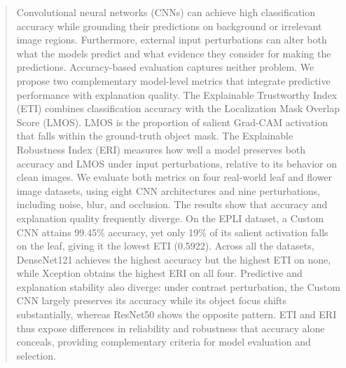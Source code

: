 \documentclass[a4paper,fleqn]{cas-dc}
\begin{document}
	
	
	
	\newcommand{\zahid}[1]{{\color{green}#1}}
	
	\begin{abstract}
	Convolutional neural networks (CNNs) can achieve high classification accuracy while grounding their predictions on background or irrelevant image regions.
	Furthermore, external input perturbations can alter both what the models predict and what evidence they consider for making the predictions. 
	Accuracy-based evaluation captures neither problem. 
	We propose two complementary model-level metrics that integrate predictive performance with explanation quality. 
	The Explainable Trustworthy Index (ETI) combines classification accuracy with the Localization Mask Overlap Score (LMOS).
	LMOS is the proportion of salient Grad-CAM activation that falls within the ground-truth object mask. The Explainable Robustness Index (ERI) measures how well a model preserves both accuracy and LMOS under input perturbations, relative to its behavior on clean images. 
	We evaluate both metrics on four real-world leaf and flower image datasets, using eight CNN architectures and nine perturbations, including noise, blur, and occlusion. The results show that accuracy and explanation quality frequently diverge. 
	On the EPLI dataset, a Custom CNN attains 99.45\% accuracy, yet only 19\% of its salient activation falls on the leaf, giving it the lowest ETI (0.5922). 
	Across all the datasets, DenseNet121 achieves the highest accuracy but the highest ETI on none, while Xception obtains the highest ERI on all four. 
	Predictive and explanation stability also diverge: under contrast perturbation, the Custom CNN largely preserves its accuracy while its object focus shifts substantially, whereas ResNet50 shows the opposite pattern. 
	ETI and ERI thus expose differences in reliability and robustness that accuracy alone conceals, providing complementary criteria for model evaluation and selection.
	\end{abstract}
	
	
\end{document}
